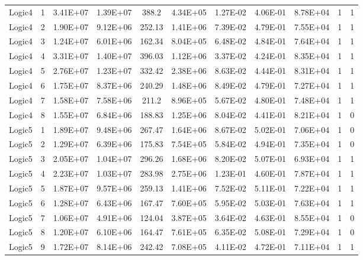 \begin{longtable}{@{}l!{\vrule}r!{\vrule}c!{\vrule}c!{\vrule}c!{\vrule}c!{\vrule}c!{\vrule}c!{\vrule}c!{\vrule}c!{\vrule}c@{}}
\hline
Logic4 & 1 & 3.41E+07 & 1.39E+07 & 388.2 & 4.34E+05 & 1.27E-02 & 4.06E-01 & 8.78E+04 & 1 & 1 \\
Logic4 & 2 & 1.90E+07 & 9.12E+06 & 252.13 & 1.41E+06 & 7.39E-02 & 4.79E-01 & 7.55E+04 & 1 & 1 \\
Logic4 & 3 & 1.24E+07 & 6.01E+06 & 162.34 & 8.04E+05 & 6.48E-02 & 4.84E-01 & 7.64E+04 & 1 & 1 \\
Logic4 & 4 & 3.31E+07 & 1.40E+07 & 396.03 & 1.12E+06 & 3.37E-02 & 4.24E-01 & 8.35E+04 & 1 & 1 \\
Logic4 & 5 & 2.76E+07 & 1.23E+07 & 332.42 & 2.38E+06 & 8.63E-02 & 4.44E-01 & 8.31E+04 & 1 & 1 \\
Logic4 & 6 & 1.75E+07 & 8.37E+06 & 240.29 & 1.48E+06 & 8.49E-02 & 4.79E-01 & 7.27E+04 & 1 & 1 \\
Logic4 & 7 & 1.58E+07 & 7.58E+06 & 211.2 & 8.96E+05 & 5.67E-02 & 4.80E-01 & 7.48E+04 & 1 & 1 \\
Logic4 & 8 & 1.55E+07 & 6.84E+06 & 188.83 & 1.25E+06 & 8.04E-02 & 4.41E-01 & 8.21E+04 & 1 & 0 \\
\hline
{}
Logic5 & 1 & 1.89E+07 & 9.48E+06 & 267.47 & 1.64E+06 & 8.67E-02 & 5.02E-01 & 7.06E+04 & 1 & 0 \\
Logic5 & 2 & 1.29E+07 & 6.39E+06 & 175.83 & 7.54E+05 & 5.84E-02 & 4.94E-01 & 7.35E+04 & 1 & 0 \\
Logic5 & 3 & 2.05E+07 & 1.04E+07 & 296.26 & 1.68E+06 & 8.20E-02 & 5.07E-01 & 6.93E+04 & 1 & 1 \\
Logic5 & 4 & 2.23E+07 & 1.03E+07 & 283.98 & 2.75E+06 & 1.23E-01 & 4.60E-01 & 7.87E+04 & 1 & 1 \\
Logic5 & 5 & 1.87E+07 & 9.57E+06 & 259.13 & 1.41E+06 & 7.52E-02 & 5.11E-01 & 7.22E+04 & 1 & 1 \\
Logic5 & 6 & 1.28E+07 & 6.43E+06 & 167.47 & 7.60E+05 & 5.95E-02 & 5.03E-01 & 7.63E+04 & 1 & 1 \\
Logic5 & 7 & 1.06E+07 & 4.91E+06 & 124.04 & 3.87E+05 & 3.64E-02 & 4.63E-01 & 8.55E+04 & 1 & 0 \\
Logic5 & 8 & 1.20E+07 & 6.10E+06 & 164.47 & 7.61E+05 & 6.35E-02 & 5.08E-01 & 7.29E+04 & 1 & 0 \\
Logic5 & 9 & 1.72E+07 & 8.14E+06 & 242.42 & 7.08E+05 & 4.11E-02 & 4.72E-01 & 7.11E+04 & 1 & 1 \\

\end{longtable}
